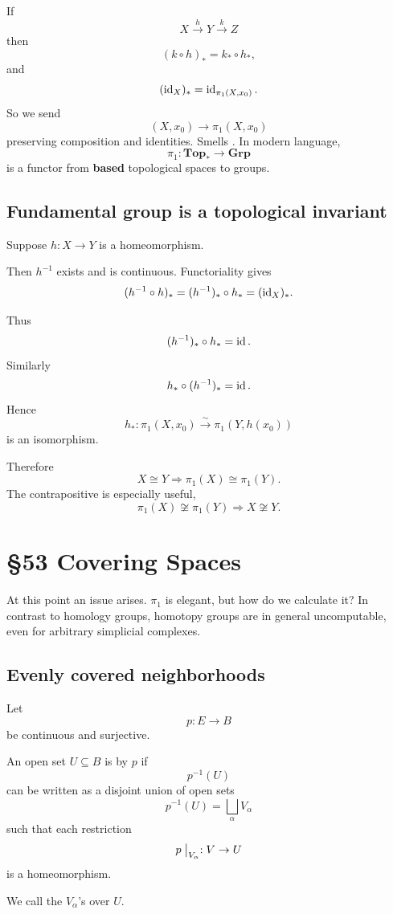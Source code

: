 \documentclass[11pt]{article}
\begin{document}
If 
\[
    X \overset h \longrightarrow 
    Y \overset k \longrightarrow Z
\]
then 
\[
    (k \circ h)_* = k_* \circ h_*, 
\]
and 
\[
    (\operatorname{id}_X)_* = \operatorname{id}_{\pi_1(X,x_0)}. 
\]
So we send 
\[
    (X,x_0) \longrightarrow \pi_1(X,x_0)
\]
preserving composition and identities. 
Smells . 
In modern language, 
\[
    \pi_1 : \textbf{Top}_* \to \textbf{Grp} 
\]
is a functor from \textbf{based} topological spaces 
to groups.

\subsection{Fundamental group is a topological invariant}

Suppose $h : X \to Y$ is a homeomorphism.

Then $h^{-1}$ exists and is continuous. 
Functoriality gives 
\[
    (h^{-1} \circ h)_* = (h^{-1})_* \circ h_* = 
    (\operatorname{id}_X)_*. 
\]

Thus 
\[
    (h^{-1})_* \circ h_* = \operatorname{id}. 
\]
Similarly 
\[
    h_* \circ (h^{-1})_* = \operatorname{id}.
\]
Hence 
\[
    h_* : \pi_1(X,x_0) \overset \sim \longrightarrow 
    \pi_1(Y,h(x_0))
\]
is an isomorphism.

Therefore 
\[
    X \cong Y \Rightarrow \pi_1(X) \cong \pi_1(Y).
\]
The contrapositive is especially useful, 
\[
    \pi_1(X) \not\cong \pi_1(Y) 
    \Rightarrow X \not\cong Y.
\]

\section{\S 53 Covering Spaces}

At this point an issue arises. 
$\pi_1$ is elegant, but how do we calculate it? 
In contrast to homology groups, homotopy groups 
are in general uncomputable, even for arbitrary simplicial complexes.

\subsection{Evenly covered neighborhoods}
Let 
\[
    p : E \to B
\]
be continuous and surjective. 

An open set $U \subseteq B$ is 
 by $p$ if 
\[
    p^{-1}(U)
\]
can be written as a disjoint union of open sets 
\[
    p^{-1}(U) 
    = \bigsqcup_\alpha V_\alpha
\]
such that each restriction 
\[
    p\bigm|_{V_\alpha} : V \to U
\]
is a homeomorphism.

We call the $V_\alpha$'s  over $U$.
\end{document}
